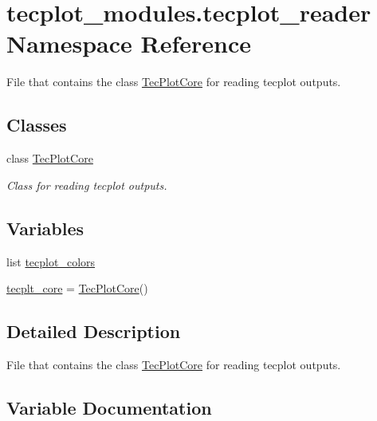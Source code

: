 \hypertarget{namespacetecplot__modules_1_1tecplot__reader}{}\section{tecplot\+\_\+modules.\+tecplot\+\_\+reader Namespace Reference}
\label{namespacetecplot__modules_1_1tecplot__reader}


File that contains the class \hyperlink{classtecplot__modules_1_1tecplot__reader_1_1_tec_plot_core}{Tec\+Plot\+Core} for reading tecplot outputs.  


\subsection*{Classes}
\begin{DoxyCompactItemize}
\item 
class \hyperlink{classtecplot__modules_1_1tecplot__reader_1_1_tec_plot_core}{Tec\+Plot\+Core}
\begin{DoxyCompactList}\small\item\em Class for reading tecplot outputs. \end{DoxyCompactList}\end{DoxyCompactItemize}
\subsection*{Variables}
\begin{DoxyCompactItemize}
\item 
list \hyperlink{namespacetecplot__modules_1_1tecplot__reader_a1e797fe85a325b8a8f10b118db5c9a47}{tecplot\+\_\+colors}
\item 
\hyperlink{namespacetecplot__modules_1_1tecplot__reader_a451a17322511f6ada93a0d61c5aa34c9}{tecplt\+\_\+core} = \hyperlink{classtecplot__modules_1_1tecplot__reader_1_1_tec_plot_core}{Tec\+Plot\+Core}()
\end{DoxyCompactItemize}


\subsection{Detailed Description}
File that contains the class \hyperlink{classtecplot__modules_1_1tecplot__reader_1_1_tec_plot_core}{Tec\+Plot\+Core} for reading tecplot outputs. 

\subsection{Variable Documentation}
\hypertarget{namespacetecplot__modules_1_1tecplot__reader_a1e797fe85a325b8a8f10b118db5c9a47}{}\label{namespacetecplot__modules_1_1tecplot__reader_a1e797fe85a325b8a8f10b118db5c9a47} 
